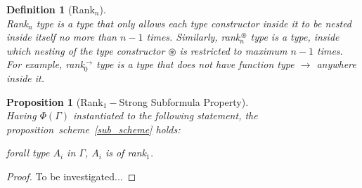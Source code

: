 \documentclass[a4paper]{article}
\newtheorem{proposition}[theorem]{Proposition}
\newtheorem{definition}{Definition}
\newcommand{\typarr}[2]{#1\boldsymbol{\rightarrow}#2}
\begin{document}
\begin{definition}[Rank$_n$]\ \\
Rank$_n$ type is a type that only allows each type constructor inside
it to be nested inside itself no more than $n - 1$ times. Similarly,
rank$_{n}^{\,\circledast}$ type is a type, inside which nesting of the
type constructor $\circledast$ is restricted to maximum $n - 1$ times.
For example, rank$_{0}^{\,\typarr{}{}}$ type is a type that does not have
function type $\typarr{}{}$ anywhere inside it.
\end{definition}

\begin{proposition}[Rank$_{1}-$Strong Subformula Property]\ \\
Having $\Phi(\Gamma)$ instantiated to the following statement, the
proposition~scheme~\ref{sub_scheme} holds:
 
 forall type $A_i$ in $\Gamma$, $A_i$ is of rank$_{1}$.
 
\end{proposition}
\begin{proof}
To be investigated...
\end{proof}

 
\end{document}
